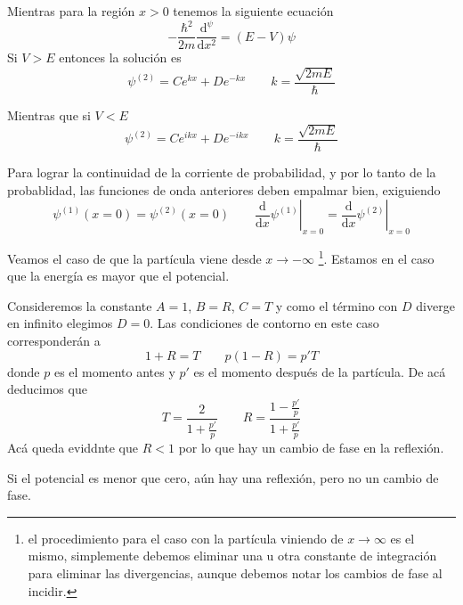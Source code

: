 Mientras para la región $x > 0$ tenemos la siguiente ecuación
\begin{equation}
    -\frac{\hbar^2}{2m} \frac{\mathrm{d}^ \psi}{\mathrm{d}x^2} = (E - V) \psi
\end{equation}
Si $V > E$ entonces la solución es
\begin{equation}
    \psi^{(2)} = C e^{k x} + D e^{-k x} \qquad k = \frac{\sqrt{2 m E}}{\hbar}
\end{equation}

Mientras que si $V < E$
\begin{equation}
    \psi^{(2)} = C e^{i k x} + D e^{-i k x} \qquad k = \frac{\sqrt{2 m E}}{\hbar}
\end{equation}

Para lograr la continuidad de la corriente de probabilidad, y por lo tanto de la probablidad, las funciones de onda anteriores deben empalmar bien, exiguiendo
\begin{equation}
    \psi^{(1)}(x = 0) = \psi^{(2)}(x = 0) \qquad \left.\frac{\mathrm{d}}{\mathrm{d}x} \psi^{(1)}\right|_{x = 0} = \left.\frac{\mathrm{d}}{\mathrm{d}x} \psi^{(2)}\right|_{x = 0} 
\end{equation}

Veamos el caso de que la partícula viene desde $x \to - \infty$ \footnote{el procedimiento para el caso con la partícula viniendo de $x \to \infty$ es el mismo, simplemente debemos eliminar una u otra constante de integración para eliminar las divergencias, aunque debemos notar los cambios de fase al incidir.}.
Estamos en el caso que la energía es mayor que el potencial.

Consideremos la constante $A = 1$, $B = R$, $C = T$ y como el término con $D$ diverge en infinito elegimos $D = 0$.
Las condiciones de contorno en este caso corresponderán a
\begin{equation}
    1 + R = T \qquad p (1 - R) = p' T
\end{equation}
donde $p$ es el momento antes y $p'$ es el momento después de la partícula.
De acá deducimos que
\begin{equation}
    T = \frac{2}{1 + \frac{p'}{p}} \qquad R = \frac{1 - \frac{p'}{p}}{1 + \frac{p'}{p}}
\end{equation}
Acá queda eviddnte que $R < 1$ por lo que hay un cambio de fase en la reflexión.

Si el potencial es menor que cero, aún hay una reflexión, pero no un cambio de fase.

